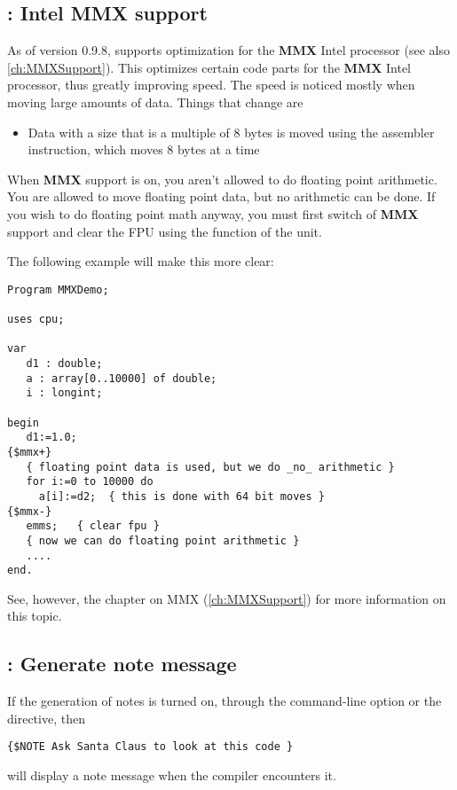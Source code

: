 \documentclass{report}
\begin{document}
 
\subsection{ : Intel MMX support}
As of version 0.9.8, \fpc supports optimization for the \textbf{MMX} Intel
processor (see also \ref{ch:MMXSupport}). This optimizes certain code parts for the \textbf{MMX} Intel
processor, thus greatly improving speed. The speed is noticed mostly when
moving large amounts of data. Things that change are
\begin{itemize}
\item Data with a size that is a multiple of 8 bytes is moved using the
 assembler instruction, which moves 8 bytes at a time
\end{itemize}

When \textbf{MMX} support is on, you aren't allowed to do floating point
arithmetic. You are allowed to move floating point data, but no arithmetic
can be done. If you wish to do floating point math anyway, you must first
switch of \textbf{MMX} support and clear the FPU using the 
function of the  unit.

The following example will make this more clear:
\begin{verbatim}
Program MMXDemo;

uses cpu;

var
   d1 : double;
   a : array[0..10000] of double;
   i : longint;

begin
   d1:=1.0;
{$mmx+}
   { floating point data is used, but we do _no_ arithmetic }
   for i:=0 to 10000 do
     a[i]:=d2;  { this is done with 64 bit moves }
{$mmx-}
   emms;   { clear fpu }
   { now we can do floating point arithmetic }
   ....
end.
\end{verbatim}
See, however, the chapter on MMX (\ref{ch:MMXSupport}) for more information
on this topic.

\subsection{ : Generate note message}

If the generation of notes is turned on, through the  command-line
option or the  directive, then
\begin{verbatim}
{$NOTE Ask Santa Claus to look at this code }
\end{verbatim}
will display a note message when the compiler encounters it.
\end{document}
